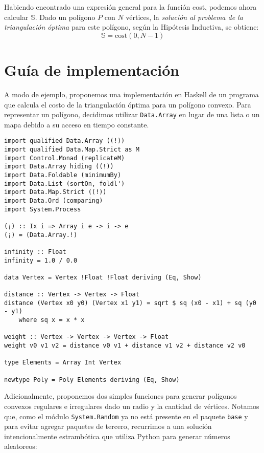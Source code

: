\documentclass[tiny]{corsage}
\newcommand{\cost}[1]{\text{cost}(#1)}
\theoremstyle{plain}
\theoremstyle{definition}
\begin{document}
	Habiendo encontrado una expresión general para la función cost, podemos ahora calcular $\mathbb{S}$.  Dado un polígono $P$ con $N$ vértices, la \emph{solución al problema de la triangulación óptima} para este polígono, según la Hipótesis Inductiva, se obtiene:
	\[ \mathbb{S} = \cost{0, N - 1}\]

\section{Guía de implementación}
	A modo de ejemplo, proponemos una implementación en Haskell de un programa que calcula el costo de la triangulación óptima para un polígono convexo.  Para representar un polígono, decidimos utilizar \texttt{Data.Array} en lugar de una lista o un mapa debido a su acceso en tiempo constante.

	\begin{verbatim}
import qualified Data.Array ((!))
import qualified Data.Map.Strict as M
import Control.Monad (replicateM)
import Data.Array hiding ((!))
import Data.Foldable (minimumBy)
import Data.List (sortOn, foldl')
import Data.Map.Strict ((!))
import Data.Ord (comparing)
import System.Process

(¡) :: Ix i => Array i e -> i -> e
(¡) = (Data.Array.!)

infinity :: Float
infinity = 1.0 / 0.0

data Vertex = Vertex !Float !Float deriving (Eq, Show)

distance :: Vertex -> Vertex -> Float
distance (Vertex x0 y0) (Vertex x1 y1) = sqrt $ sq (x0 - x1) + sq (y0 - y1)
	where sq x = x * x

weight :: Vertex -> Vertex -> Vertex -> Float
weight v0 v1 v2 = distance v0 v1 + distance v1 v2 + distance v2 v0

type Elements = Array Int Vertex

newtype Poly = Poly Elements deriving (Eq, Show)
	\end{verbatim}

	Adicionalmente, proponemos dos simples funciones para generar polígonos convexos regulares e irregulares dado un radio y la cantidad de vértices.  Notamos que, como el módulo \texttt{System.Random} ya no está presente en el paquete \texttt{base} y para evitar agregar paquetes de tercero, recurrimos a una solución intencionalmente estrambótica que utiliza Python para generar números aleatoreos:
\end{document}
